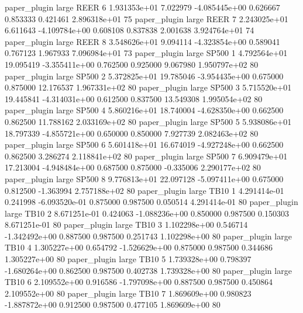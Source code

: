        paper_plugin      large     REER                 6 1.931353e+01      7.022979 -4.085445e+00 0.626667 0.853333       0.421461 2.896318e+01 75
       paper_plugin      large     REER                 7 2.243025e+01      6.611643 -4.109784e+00 0.608108 0.837838       2.001638 3.924764e+01 74
       paper_plugin      large     REER                 8 3.548626e+01      9.094114 -4.323854e+00 0.589041 0.767123       1.967933 7.096984e+01 73
       paper_plugin      large    SP500                 1 4.792564e+01     19.095419 -3.355411e+00 0.762500 0.925000       9.067980 1.950797e+02 80
       paper_plugin      large    SP500                 2 5.372825e+01     19.785046 -3.954435e+00 0.675000 0.875000      12.176537 1.967331e+02 80
       paper_plugin      large    SP500                 3 5.715520e+01     19.445841 -4.314031e+00 0.612500 0.837500      13.549308 1.995054e+02 80
       paper_plugin      large    SP500                 4 5.860216e+01     18.740004 -4.628350e+00 0.662500 0.862500      11.788162 2.033169e+02 80
       paper_plugin      large    SP500                 5 5.938086e+01     18.797339 -4.855721e+00 0.650000 0.850000       7.927739 2.082463e+02 80
       paper_plugin      large    SP500                 6 5.601418e+01     16.674019 -4.927248e+00 0.662500 0.862500       3.286274 2.118841e+02 80
       paper_plugin      large    SP500                 7 6.909479e+01     17.213004 -4.948484e+00 0.687500 0.875000      -0.335006 2.290177e+02 80
       paper_plugin      large    SP500                 8 9.776813e+01     22.097128 -5.097411e+00 0.675000 0.812500      -1.363994 2.757188e+02 80
       paper_plugin      large     TB10                 1 4.291414e-01      0.241998 -6.093520e-01 0.875000 0.987500       0.050514 4.291414e-01 80
       paper_plugin      large     TB10                 2 8.671251e-01      0.424063 -1.088236e+00 0.850000 0.987500       0.150303 8.671251e-01 80
       paper_plugin      large     TB10                 3 1.102298e+00      0.546714 -1.342492e+00 0.887500 0.987500       0.251743 1.102298e+00 80
       paper_plugin      large     TB10                 4 1.305227e+00      0.654792 -1.526629e+00 0.875000 0.987500       0.344686 1.305227e+00 80
       paper_plugin      large     TB10                 5 1.739328e+00      0.798397 -1.680264e+00 0.862500 0.987500       0.402738 1.739328e+00 80
       paper_plugin      large     TB10                 6 2.109552e+00      0.916586 -1.797098e+00 0.887500 0.987500       0.450864 2.109552e+00 80
       paper_plugin      large     TB10                 7 1.869609e+00      0.980823 -1.887872e+00 0.912500 0.987500       0.477105 1.869609e+00 80

